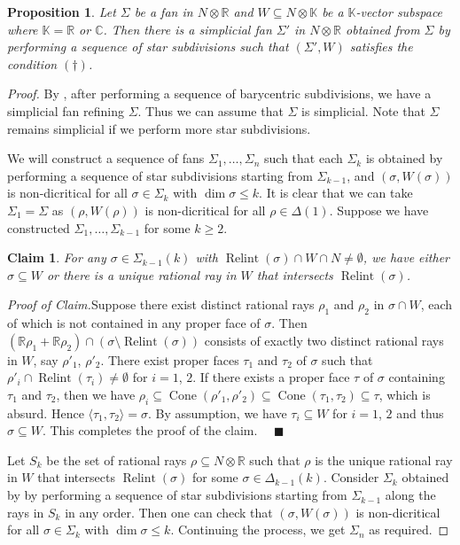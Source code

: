 \documentclass[12pt,reqno]{amsart}
\newtheorem*{claim}{Claim}
\newtheorem{proposition}[theorem]{Proposition}
\theoremstyle{definition}
\newcommand{\on}{\operatorname}
\newenvironment{claimproof}[1]{\par\noindent\emph{Proof of Claim.}\space#1}{}
\newcommand\bC{{\mathbb C}}
\newcommand\bK{{\mathbb K}}
\newcommand\bR{{\mathbb R}}
\begin{document}
\begin{proposition}\label{dagger_resolution}
    Let $\Sigma$ be a fan in $N\otimes\bR$ and $W\subseteq N\otimes\bK$ be a $\bK$-vector subspace where $\bK = \bR$ or $\bC$. 
    Then there is a simplicial fan $\Sigma'$ in $N\otimes\bR$ obtained from $\Sigma$ by performing a sequence of star subdivisions such that $(\Sigma',W)$ satisfies the condition $(\dagger)$. 
\end{proposition}
\begin{proof}
    By \cite[Exercise 11.1.10]{CLS11}, after performing a sequence of barycentric subdivisions, we have a simplicial fan refining $\Sigma$. 
    Thus we can assume that $\Sigma$ is simplicial. 
    Note that $\Sigma$ remains simplicial if we perform more star subdivisions.
    
    We will construct a sequence of fans $\Sigma_1,\ldots,\Sigma_n$ such that each $\Sigma_k$ is obtained by performing a sequence of star subdivisions starting from $\Sigma_{k-1}$, and $(\sigma,W(\sigma))$ is non-dicritical for all $\sigma\in\Sigma_k$ with $\dim\sigma\leq k$. It is clear that we can take $\Sigma_1=\Sigma$ as $(\rho,W(\rho))$ is non-dicritical for all $\rho\in\Delta(1)$. Suppose we have constructed $\Sigma_1,\ldots,\Sigma_{k-1}$ for some $k\geq 2$.
    
    \begin{claim}
        For any $\sigma\in\Sigma_{k-1}(k)$ with $
        \on{Relint}(\sigma)\cap W\cap N\neq\emptyset$, we have either $\sigma\subseteq W$ or there is a unique rational ray in $W$ that intersects $\on{Relint}(\sigma)$. 
    \end{claim}
    \begin{claimproof}
        Suppose there exist distinct rational rays $\rho_1$ and $\rho_2$ in $\sigma\cap W$, each of which is not contained in any proper face of $\sigma$.
        Then $(\bR\rho_1+\bR\rho_2)\cap(\sigma\setminus\on{Relint}(\sigma))$ consists of exactly two distinct rational rays in $W$, say $\rho'_1$, $\rho'_2$. 
        There exist proper faces $\tau_1$ and $\tau_2$ of $\sigma$ such that $\rho'_i\cap\on{Relint}(\tau_i)\neq\emptyset$ for $i=1$, $2$. 
        If there exists a proper face $\tau$ of $\sigma$ containing $\tau_1$ and $\tau_2$, then we have 
        $\rho_i\subseteq\on{Cone}(\rho'_1,\rho'_2)\subseteq\on{Cone}(\tau_1,\tau_2)\subseteq\tau$, which is absurd. 
        Hence $\langle \tau_1,\tau_2\rangle=\sigma$. 
        By assumption, we have $\tau_i\subseteq W$ for $i=1$, $2$ and thus $\sigma\subseteq W$. 
        This completes the proof of the claim. $\quad\blacksquare$
    \end{claimproof}
    
    Let $S_k$ be the set of rational rays $\rho\subseteq N\otimes\bR$ such that $\rho$ is the unique rational ray in $W$ that intersects $\on{Relint}(\sigma)$ for some $\sigma\in\Delta_{k-1}(k)$.
    Consider $\Sigma_k$ obtained by by performing a sequence of star subdivisions starting from $\Sigma_{k-1}$ along the rays in $S_k$ in any order. Then one can check that $(\sigma,W(\sigma))$ is non-dicritical for all $\sigma\in\Sigma_k$ with $\dim\sigma\leq k$. 
    Continuing the process, we get $\Sigma_n$ as required. 
\end{proof}
\end{document}
